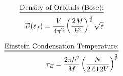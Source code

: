 \documentclass[12pt]{article}
\begin{document}
\noindent{}

\begin{multicols}{2}

  \begin{equation*}
    \begin{split}
    \text{\underline{Density of Orbitals (Bose):}}\\
    \mathcal{D}(\varepsilon_f)=\frac{V}{4\pi^2}\left( \frac{2M}{\hbar^2} \right)^{\frac{3}{2}}\sqrt{\varepsilon}
    \end{split}
  \end{equation*}

  \begin{equation*}
    \begin{split}
      \text{\underline{Einstein Condensation Temperature:}}\\
      \tau_E=\frac{2\pi\hbar^2}{M}\left( \frac{N}{2.612V} \right)^{\frac{2}{3}}
    \end{split}
  \end{equation*}

\end{multicols}
\end{document}

